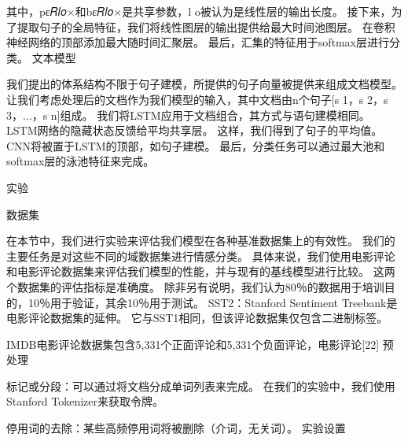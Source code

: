 \documentclass[a4paper,AutoFakeBold,oneside,12pt]{book}
\begin{document}
其中，pε𝑅𝑙𝑜×和bε𝑅𝑙𝑜×是共享参数，l o被认为是线性层的输出长度。 接下来，为了提取句子的全局特征，我们将线性图层的输出提供给最大时间池图层。 在卷积神经网络的顶部添加最大随时间汇聚层。 最后，汇集的特征用于softmax层进行分类。
文本模型


我们提出的体系结构不限于句子建模，所提供的句子向量被提供来组成文档模型。 让我们考虑处理后的文档作为我们模型的输入，其中文档由n个句子[s 1，s 2，s 3，...，s n]组成。 我们将LSTM应用于文档组合，其方式与语句建模相同。 LSTM网络的隐藏状态反馈给平均共享层。 这样，我们得到了句子的平均值。
CNN将被置于LSTM的顶部，如句子建模。 最后，分类任务可以通过最大池和softmax层的泳池特征来完成。

实验

数据集

在本节中，我们进行实验来评估我们模型在各种基准数据集上的有效性。 我们的主要任务是对这些不同的域数据集进行情感分类。 具体来说，我们使用电影评论和电影评论数据集来评估我们模型的性能，并与现有的基线模型进行比较。 这两个数据集的评估指标是准确度。 除非另有说明，我们认为80％的数据用于培训目的，10％用于验证，其余10％用于测试。
SST2：Stanford Sentiment Treebank是电影评论数据集的延伸。 它与SST1相同，但该评论数据集仅包含二进制标签。

IMDB电影评论数据集包含5,331个正面评论和5,331个负面评论，电影评论[22]
预处理

标记或分段：可以通过将文档分成单词列表来完成。 在我们的实验中，我们使用Stanford Tokenizer来获取令牌。

停用词的去除：某些高频停用词将被删除（介词，无关词）。
实验设置
\end{document}
